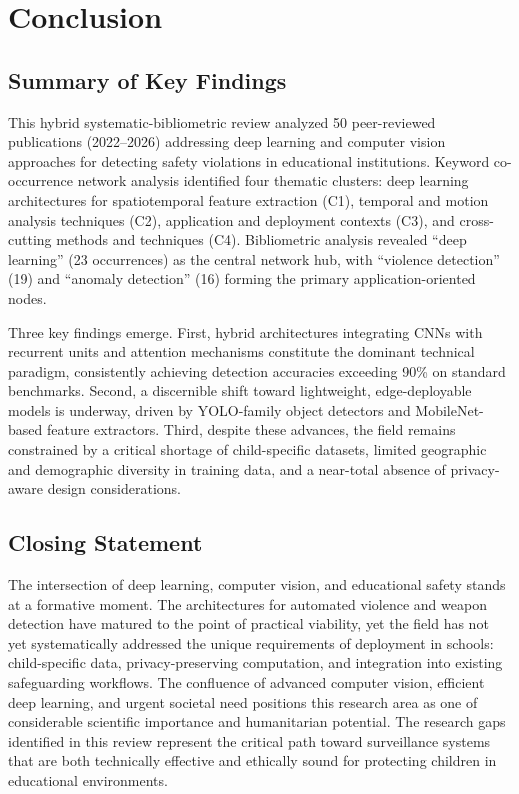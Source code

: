 \documentclass[conference]{IEEEtran}
\begin{document}
\section{Conclusion}

\subsection{Summary of Key Findings}

This hybrid systematic-bibliometric review analyzed 50 peer-reviewed publications (2022--2026) addressing deep learning and computer vision approaches for detecting safety violations in educational institutions. Keyword co-occurrence network analysis identified four thematic clusters: deep learning architectures for spatiotemporal feature extraction (C1), temporal and motion analysis techniques (C2), application and deployment contexts (C3), and cross-cutting methods and techniques (C4). Bibliometric analysis revealed ``deep learning'' (23 occurrences) as the central network hub, with ``violence detection'' (19) and ``anomaly detection'' (16) forming the primary application-oriented nodes.

Three key findings emerge. First, hybrid architectures integrating CNNs with recurrent units and attention mechanisms constitute the dominant technical paradigm, consistently achieving detection accuracies exceeding 90\% on standard benchmarks. Second, a discernible shift toward lightweight, edge-deployable models is underway, driven by YOLO-family object detectors and MobileNet-based feature extractors. Third, despite these advances, the field remains constrained by a critical shortage of child-specific datasets, limited geographic and demographic diversity in training data, and a near-total absence of privacy-aware design considerations.

\subsection{Closing Statement}

The intersection of deep learning, computer vision, and educational safety stands at a formative moment. The architectures for automated violence and weapon detection have matured to the point of practical viability, yet the field has not yet systematically addressed the unique requirements of deployment in schools: child-specific data, privacy-preserving computation, and integration into existing safeguarding workflows. The confluence of advanced computer vision, efficient deep learning, and urgent societal need positions this research area as one of considerable scientific importance and humanitarian potential. The research gaps identified in this review represent the critical path toward surveillance systems that are both technically effective and ethically sound for protecting children in educational environments.
\end{document}
